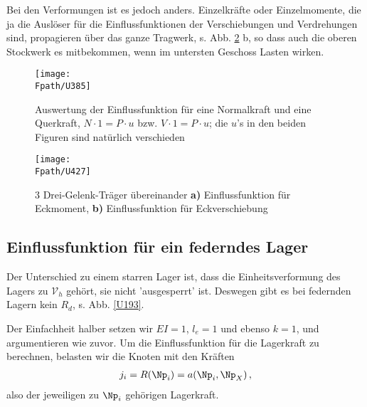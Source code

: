 {{Bei den Verformungen ist es jedoch anders. Einzelkr\"{a}fte oder Einzelmomente, die ja die Ausl\"{o}ser f\"{u}r die Einflussfunktionen der Verschiebungen und Verdrehungen sind, propagieren \"{u}ber das ganze Tragwerk, s. Abb. \ref{U427} b, so dass auch die oberen Stockwerk es mitbekommen, wenn im untersten Geschoss Lasten wirken.


\begin{figure}[tbp]
\centering
\if {} \sidecaption \fi
\texttt{[image: \\Fpath/U385]}
\caption{Auswertung der Einflussfunktion f\"{u}r eine Normalkraft und eine Querkraft, $N \cdot 1 = P\cdot u$ bzw. $V \cdot 1 = P\cdot u$; die $u$'s in den beiden Figuren sind nat\"{u}rlich verschieden} \label{U3}
\end{figure}%

\begin{figure}[tbp]
\centering
\if {} \sidecaption \fi
\texttt{[image: \\Fpath/U427]}
\caption{3 Drei-Gelenk-Tr\"{a}ger \"{u}bereinander \textbf{ a)} Einflussfunktion f\"{u}r Eckmoment, \textbf{ b)} Einflussfunktion f\"{u}r Eckverschiebung} \label{U427}
\end{figure}%

{\textcolor{blau2}{\section{Einflussfunktion f\"{u}r ein federndes Lager}}}

Der Unterschied zu einem starren Lager ist, dass die Einheitsverformung des Lagers zu $\mathcal{V}_h$ geh\"{o}rt, sie nicht 'ausgesperrt' ist. Deswegen gibt es bei federnden Lagern kein $R_d$, s. Abb. \ref{U193}.


Der Einfachheit halber setzen wir $EI = 1$, $l_e = 1$ und ebenso $ k = 1$, und argumentieren wie zuvor. Um die Einflussfunktion f\"{u}r die Lagerkraft zu berechnen, belasten wir die Knoten mit den Kr\"{a}ften
\begin{align}
j_i = R(\Np_i) = a(\Np_i,\Np_X)\,,
\end{align}
also der jeweiligen zu $\Np_i$ geh\"{o}rigen Lagerkraft.

}}
